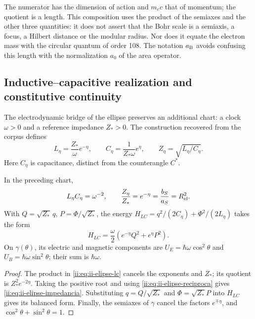 The numerator has the dimension of action and \(m_ec\) that of momentum; the quotient is a length. This composition uses the product of the semiaxes and the other three quantities: it does not assert that the Bohr scale is a semiaxis, a focus, a Hilbert distance or the modular radius. Nor does it equate the electron mass with the circular quantum of order 108. The notation \(a_{\rm B}\) avoids confusing this length with the normalization \(a_0\) of the area operator.

\subsection{Inductive--capacitive realization and constitutive continuity}
\label{ii:sec:ii-elipse-lc}

The electrodynamic bridge of the ellipse preserves an additional chart: a clock \(\omega>0\) and a reference impedance \(Z_*>0\). The construction recovered from the corpus defines
\begin{equation}
 L_\eta=\frac{Z_*}{\omega}e^{-\eta},\qquad
 C_\eta=\frac{1}{Z_*\omega}e^\eta,
 \qquad Z_\eta=\sqrt{L_\eta/C_\eta}.
 \label{ii:eq:ii-elipse-lc}
\end{equation}
Here \(C_\eta\) is capacitance, distinct from the counterangle \(C^*\).
\begin{proposition}
\label{ii:prop:ii-elipse-lc}
In the preceding chart,
\begin{equation}
 L_\eta C_\eta=\omega^{-2},\qquad
 \frac{Z_\eta}{Z_*}=e^{-\eta}
 =\frac{b_S}{a_S}=R_{\rm el}^{2}.
 \label{ii:eq:ii-elipse-impedancia}
\end{equation}
With \(Q=\sqrt{Z_*}\,q\), \(P=\Phi/\sqrt{Z_*}\), the energy
\(H_{LC}=q^2/(2C_\eta)+\Phi^2/(2L_\eta)\) takes the form
\[
 H_{LC}=\frac\omega2(e^{-\eta}Q^2+e^\eta P^2).
\]
On \(\gamma(\theta)\), its electric and magnetic components are
\(U_E=\hbar\omega\cos^2\theta\) and
\(U_B=\hbar\omega\sin^2\theta\); their sum is \(\hbar\omega\).
\end{proposition}
\begin{proof}
The product in \eqref{ii:eq:ii-elipse-lc} cancels the exponents and \(Z_*\); its quotient is \(Z_*^2e^{-2\eta}\). Taking the positive root and using \eqref{ii:eq:ii-elipse-reciproca} gives \eqref{ii:eq:ii-elipse-impedancia}. Substituting \(q=Q/\sqrt{Z_*}\) and \(\Phi=\sqrt{Z_*}P\) into \(H_{LC}\) gives its balanced form. Finally, the semiaxes of \(\gamma\) cancel the factors \(e^{\mp\eta}\), and \(\cos^2\theta+\sin^2\theta=1\).
\end{proof}


